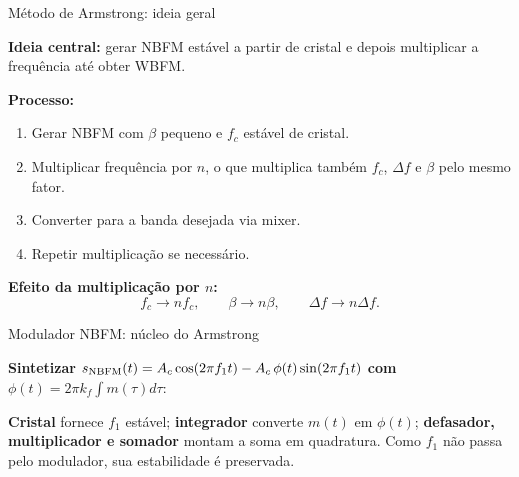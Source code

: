
\begin{frame}{Método de Armstrong: ideia geral}

\textbf{Ideia central:} gerar NBFM estável a partir de cristal e depois multiplicar a frequência até obter WBFM.

\vspace{0.4cm}
\pause
\textbf{Processo:}

\begin{enumerate}
\item Gerar NBFM com $\beta$ pequeno e $f_c$ estável de cristal.
\item Multiplicar frequência por $n$, o que multiplica também $f_c$, $\Delta f$ e $\beta$ pelo mesmo fator.
\item Converter para a banda desejada via mixer.
\item Repetir multiplicação se necessário.
\end{enumerate}

\pause
\vspace{0.3cm}
\textbf{Efeito da multiplicação por $n$:}
\[
f_c \to n f_c, \qquad \beta \to n\beta, \qquad \Delta f \to n\Delta f.
\]

\end{frame}


\begin{frame}{Modulador NBFM: núcleo do Armstrong}

\textbf{Sintetizar} $s_{\text{NBFM}}(t) = A_c\cos(2\pi f_1 t) - A_c\,\phi(t)\sin(2\pi f_1 t)$ \textbf{com} $\phi(t) = 2\pi k_f\!\int m(\tau)d\tau$:

\begin{center}
\end{center}

\textbf{Cristal} fornece $f_1$ estável; \textbf{integrador} converte $m(t)$ em $\phi(t)$; \textbf{defasador, multiplicador e somador} montam a soma em quadratura. Como $f_1$ não passa pelo modulador, sua estabilidade é preservada.

\end{frame}

